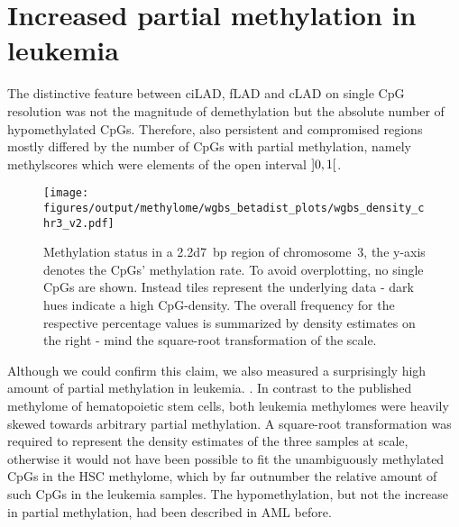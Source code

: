 \section{Increased partial methylation in leukemia}
\label{chap:r:comprom:partial} 

The distinctive feature between ciLAD, fLAD and cLAD on single CpG resolution was not the magnitude of demethylation but the absolute number of hypomethylated CpGs. Therefore, also persistent and compromised regions mostly differed by the number of CpGs with partial methylation, namely methylscores which were elements of the open interval $\interval[open]{0}{1}$. 

\begin{figure}[!ht]
	\centering
	\texttt{[image: figures/output/methylome/wgbs\_betadist\_plots/wgbs\_density\_chr3\_v2.pdf]} 
	\caption[Methylation status within a sample region on chr3]{Methylation status in a \SI{2.2d7}{bp} region of chromosome~3, the y-axis
		denotes the CpGs' methylation rate. To avoid overplotting, no single CpGs are shown. Instead tiles represent the underlying data - dark hues indicate a high CpG-density. The overall frequency for the respective percentage values is summarized by density estimates on the right - mind the square-root transformation of the scale.}
	\label{fig:wgbs_density_chr3}
\end{figure}

Although we could confirm this claim, we also measured a surprisingly high amount of partial methylation in \dnmtwt \kitpos leukemia. . In contrast to the published methylome of \dnmtwt hematopoietic stem cells\cite{Jeong2014}, both \kitpos leukemia methylomes were heavily skewed towards arbitrary partial methylation. A square-root transformation was required to represent the density estimates of the three samples at scale, otherwise it would not have been possible to fit the unambiguously methylated CpGs in the HSC methylome, which by far outnumber the relative amount of such CpGs in the leukemia samples. The hypomethylation, but not the increase in partial methylation, had been described in \mllafnine AML before.

